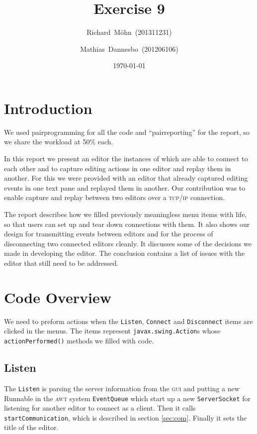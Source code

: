 \documentclass[a4paper,draft,12pt,oneside,article,table]{memoir}
\newcommand{\supertitle}[1]{\gdef\suP{#1}}
\newcommand{\subtitle}[1]{\gdef\suB{#1}}
\newcommand{\stunum}[1]{\gdef\stuN{#1}}
\newcommand{\mil}[1]{\texttt{#1}}
\begin{document}
\supertitle{Distributed Systems}
\title{Exercise 9}
\author{Richard~Möhn~\small{(201311231)} \and Mathias~Dannesbo~\small{(201206106)}}
\date{\today}
\maketitle

\chapter{Introduction}
We used pairprogramming for all the code and ``pairreporting'' for the
report, so we share the workload at 50\% each.

In this report we present an editor the instances of which are able to
connect to each other and to capture editing actions in one editor and
replay them in another. For this we were provided with an editor that
already captured editing events in one text pane and replayed them in
another. Our contribution was to enable capture and replay between
two editors over a \textsc{tcp/ip} connection.

The report describes how we filled previously meaningless menu items
with life, so that users can set up and tear down connections with them.
It also shows our design for transmitting events between editors and for
the process of disconnecting two connected editors cleanly. It discusses
some of the decisions we made in developing the editor. The conclusion
contains a list of issues with the editor that still need to be
addressed.

\chapter{Code Overview}
We need to preform actions when the \mil{Listen}, \mil{Connect} and
\mil{Disconnect} items are clicked in the menus. The items represent
\mil{javax.swing.Action}s whose \mil{actionPerformed()} methods we
filled with code.

\section{Listen}

The \mil{Listen} is parsing the server information from the
\textsc{gui} and putting a new Runnable in the \textsc{awt} system
\mil{EventQueue} which start up a new \mil{ServerSocket} for
listening for another editor to connect as a client. Then it calls
\mil{startCommunication}, which is described in section
\ref{sec:com}. Finally it sets the title of the editor.
\end{document}

